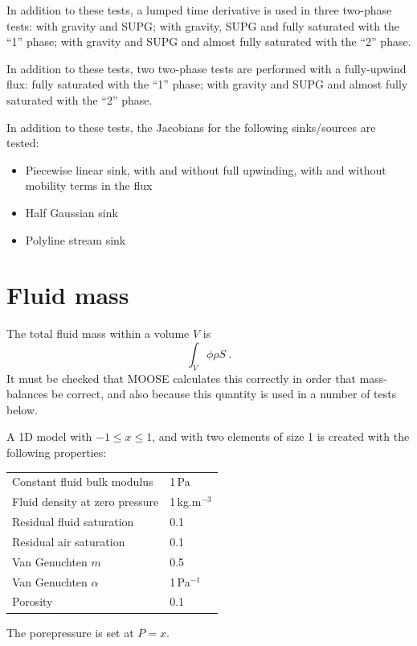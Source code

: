 \documentclass[]{scrreprt}
\begin{document}
In addition to these tests, a lumped time derivative is used in three
two-phase tests: with gravity and SUPG; with gravity, SUPG and fully
saturated with the ``1'' phase; with gravity and SUPG and almost fully
saturated with the ``2'' phase.

In addition to these tests, two two-phase tests are performed with a
fully-upwind flux: fully saturated with the ``1'' phase; with gravity
and SUPG and almost fully saturated with the ``2'' phase.

In addition to these tests, the Jacobians for the following sinks/sources are tested:
\begin{itemize}
\item Piecewise linear sink, with and without full upwinding, with and without mobility terms in the flux
\item Half Gaussian sink
\item Polyline stream sink
\end{itemize}



\chapter{Fluid mass}
\label{ma}

The total fluid mass within a volume $V$ is
\begin{equation}
\int_{V} \phi\rho S \ .
\end{equation}
It must be checked that MOOSE calculates this correctly in order that
mass-balances be correct, and also because this quantity is used in a
number of tests below.

A 1D model with $-1\leq x \leq 1$, and with two elements of size 1 is
created with the following properties:
\begin{center}
\begin{tabular}{|ll|}
\hline
Constant fluid bulk modulus & 1\,Pa \\
Fluid density at zero pressure & 1\,kg.m$^{-3}$ \\
Residual fluid saturation & 0.1 \\
Residual air saturation & 0.1 \\
Van Genuchten $m$ & 0.5 \\
Van Genuchten $\alpha$ & 1\,Pa$^{-1}$ \\
Porosity & 0.1 \\
\hline
\end{tabular} 
\end{center}
The porepressure is set at $P=x$.
\end{document}
